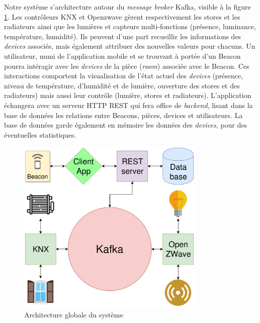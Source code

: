 Notre système s'architecture autour du \textit{message broker} Kafka, visible à la figure \ref{shema_general}. Les contrôleurs KNX et Openzwave gèrent respectivement les stores et les radiateurs ainsi que les lumières et capteurs multi-fonctions (présence, luminance, température, humidité). Ils peuvent d'une part recueillir les informations des \textit{devices} associés, mais également attribuer des nouvelles valeurs pour chacuns. Un utilisateur, muni de l'application mobile et se trouvant à portée d'un Beacon pourra intéragir avec les \textit{devices} de la pièce (\textit{room}) associée avec le Beacon. Ces interactions comportent la visualisation de l'état actuel des \textit{devices} (présence, niveau de température, d'humidité et de lumière, ouverture des stores et des radiateurs) mais aussi leur contrôle (lumière, stores et radiateurs). L'application échangera avec un serveur HTTP REST qui fera office de \textit{backend}, lisant dans la base de données les relations entre Beacons, pièces, devices et utilisateurs. La base de données garde également en mémoire les données des \textit{devices}, pour des éventuelles statistiques.

\begin{figure}
    \begin{center}
        \includegraphics[width=0.8\textwidth]{img/general.png}
    \end{center}
    \caption{Architecture globale du système}
    \label{shema_general}
\end{figure}
